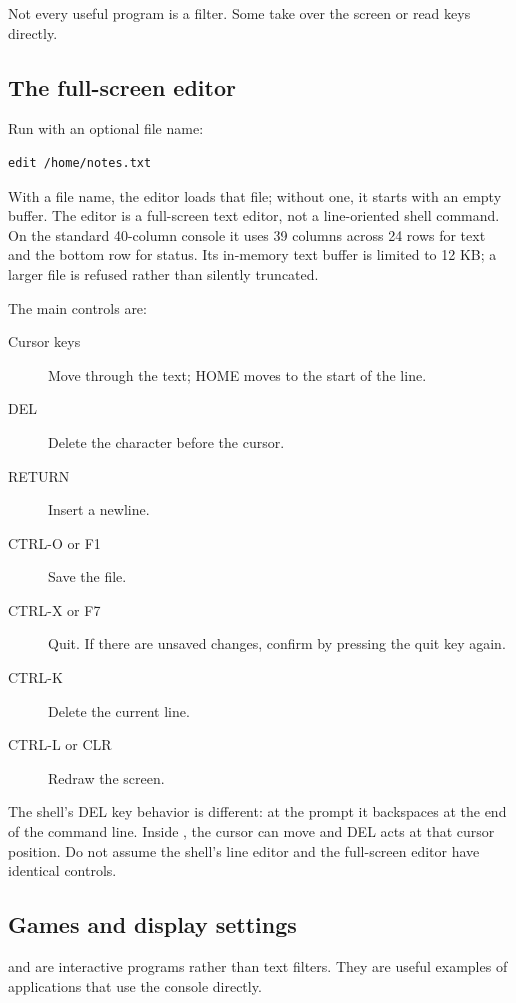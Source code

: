 Not every useful program is a filter. Some take over the screen or read keys directly.

\subsection{The full-screen editor}

Run  with an optional file name:

\begin{lstlisting}
edit /home/notes.txt
\end{lstlisting}

With a file name, the editor loads that file; without one, it starts with an empty buffer. The editor is a full-screen text editor, not a line-oriented shell command. On the standard 40-column console it uses 39 columns across 24 rows for text and the bottom row for status. Its in-memory text buffer is limited to 12 KB; a larger file is refused rather than silently truncated.

The main controls are:

\begin{description}
  \item[Cursor keys] Move through the text; HOME moves to the start of the line.
  \item[DEL] Delete the character before the cursor.
  \item[RETURN] Insert a newline.
  \item[CTRL-O or F1] Save the file.
  \item[CTRL-X or F7] Quit. If there are unsaved changes, confirm by pressing the quit key again.
  \item[CTRL-K] Delete the current line.
  \item[CTRL-L or CLR] Redraw the screen.
\end{description}

The shell's DEL key behavior is different: at the prompt it backspaces at the end of the command line. Inside , the cursor can move and DEL acts at that cursor position. Do not assume the shell's line editor and the full-screen editor have identical controls.

\subsection{Games and display settings}

 and  are interactive programs rather than text filters. They are useful examples of applications that use the console directly.

